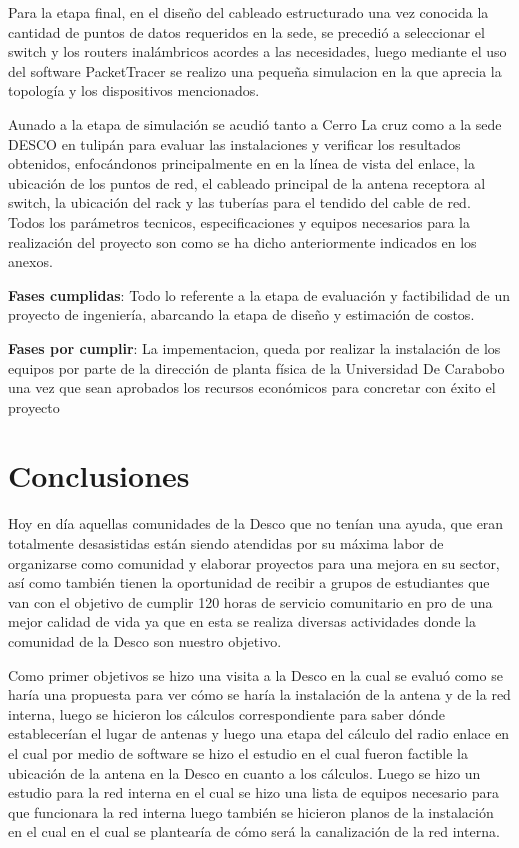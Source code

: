 \documentclass[11pt, a4paper, twosides]{report}
\begin{document}
Para la etapa final, en el diseño del cableado estructurado una vez conocida la cantidad de puntos de datos requeridos en la sede, se precedió a seleccionar el switch y los routers inalámbricos acordes a las necesidades, luego mediante el uso del software PacketTracer se realizo una pequeña simulacion en la que aprecia la topología y los dispositivos mencionados.

Aunado a la etapa de simulación  se acudió tanto a Cerro La cruz como a la sede DESCO en tulipán para evaluar las instalaciones y verificar los resultados obtenidos, enfocándonos principalmente en en la línea de vista del enlace, la ubicación de los puntos de red, el cableado principal de la antena receptora al switch, la ubicación del rack y las tuberías para el tendido del cable de red.
Todos los parámetros tecnicos, especificaciones y equipos necesarios para la realización del proyecto son como se ha dicho anteriormente indicados en los anexos.

\textbf{Fases cumplidas}: Todo lo referente a la etapa de evaluación y factibilidad de un proyecto de ingeniería, abarcando la etapa de diseño y estimación de costos.

\textbf{Fases por cumplir}: La impementacion, queda por realizar la instalación de los equipos por parte de la dirección de planta física de la Universidad De Carabobo una vez que sean aprobados los recursos económicos para concretar con éxito el proyecto


\chapter{Conclusiones} 
Hoy en día aquellas comunidades de la Desco que no tenían una ayuda, que eran totalmente desasistidas están siendo atendidas por su máxima labor de organizarse como comunidad y elaborar proyectos para una mejora en su sector, así como también tienen la oportunidad de recibir a grupos de estudiantes que van con el objetivo de cumplir 120 horas de servicio comunitario en pro de una mejor calidad de vida ya que en esta se realiza diversas actividades donde la comunidad de la Desco son nuestro objetivo.

Como primer objetivos se hizo una visita a la Desco en la cual se evaluó como se haría una propuesta para ver cómo se haría la instalación de la antena y de la red interna, luego se hicieron los cálculos correspondiente para saber dónde establecerían el lugar de antenas y luego una etapa del cálculo del radio enlace en el cual por medio de software se hizo el estudio en el cual fueron factible la ubicación de la antena en la Desco en cuanto a los cálculos. Luego se hizo un estudio para la red interna en el cual se hizo una lista de equipos necesario para que funcionara la red interna luego también se hicieron planos de la instalación en el cual en el cual se plantearía de cómo será la canalización de la red interna.
\end{document}
